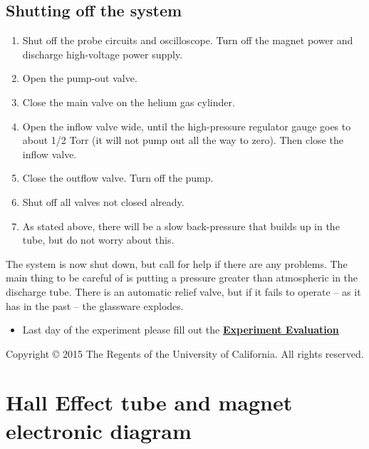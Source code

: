 \documentclass{../lab}
\begin{document}
\newpage

\subsection{Shutting off the system}

\begin{enumerate}
    \item Shut off the probe circuits and oscilloscope. Turn off the magnet power and discharge high-voltage power supply.

    \item Open the pump-out valve.

    \item Close the main valve on the helium gas cylinder.

    \item Open the inflow valve wide, until the high-pressure regulator gauge goes to about 1/2 Torr (it will not pump out all the way to zero). Then close the inflow valve.

    \item Close the outflow valve. Turn off the pump.

    \item Shut off all valves not closed already.

    \item As stated above, there will be a slow back-pressure that builds up in the tube, but do not worry about this.
\end{enumerate}

\noindent The system is now shut down, but call for help if there are any problems. The main thing to be careful of is putting a pressure greater than atmospheric in the discharge tube. There is an automatic relief valve, but if it fails to operate -- as it has in the past -- the glassware explodes.

\begin{itemize}
    \item Last day of the experiment please fill out the \href{\ExperimentEvaluation}{\textbf{Experiment Evaluation}}
\end{itemize}

Copyright © 2015 The Regents of the University of California. All rights reserved.

\section{Hall Effect tube and magnet electronic diagram}
\end{document}
